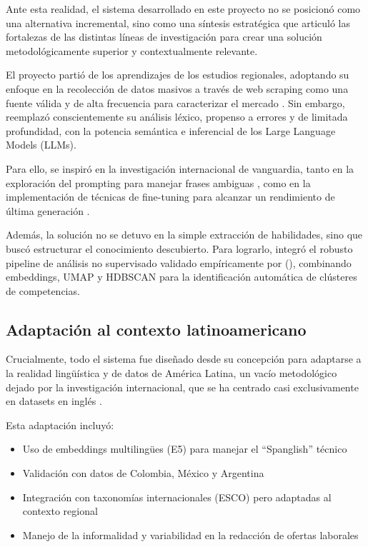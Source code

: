 Ante esta realidad, el sistema desarrollado en este proyecto no se posicionó como una alternativa incremental, sino como una síntesis estratégica que articuló las fortalezas de las distintas líneas de investigación para crear una solución metodológicamente superior y contextualmente relevante.

El proyecto partió de los aprendizajes de los estudios regionales, adoptando su enfoque en la recolección de datos masivos a través de web scraping como una fuente válida y de alta frecuencia para caracterizar el mercado \cite{aguilera2018, martinez2024, rubio2024}. Sin embargo, reemplazó conscientemente su análisis léxico, propenso a errores y de limitada profundidad, con la potencia semántica e inferencial de los Large Language Models (LLMs).

Para ello, se inspiró en la investigación internacional de vanguardia, tanto en la exploración del prompting para manejar frases ambiguas \cite{nguyen2024}, como en la implementación de técnicas de fine-tuning para alcanzar un rendimiento de última generación \cite{herandi2024}.

Además, la solución no se detuvo en la simple extracción de habilidades, sino que buscó estructurar el conocimiento descubierto. Para lograrlo, integró el robusto pipeline de análisis no supervisado validado empíricamente por \citeauthor{lukauskas2023} (\citeyear{lukauskas2023}), combinando embeddings, UMAP y HDBSCAN para la identificación automática de clústeres de competencias.

\subsection{Adaptación al contexto latinoamericano}

Crucialmente, todo el sistema fue diseñado desde su concepción para adaptarse a la realidad lingüística y de datos de América Latina, un vacío metodológico dejado por la investigación internacional, que se ha centrado casi exclusivamente en datasets en inglés \cite{herandi2024}.

Esta adaptación incluyó:

\begin{itemize}
    \item Uso de embeddings multilingües (E5) para manejar el ``Spanglish'' técnico
    \item Validación con datos de Colombia, México y Argentina
    \item Integración con taxonomías internacionales (ESCO) pero adaptadas al contexto regional
    \item Manejo de la informalidad y variabilidad en la redacción de ofertas laborales
\end{itemize}

